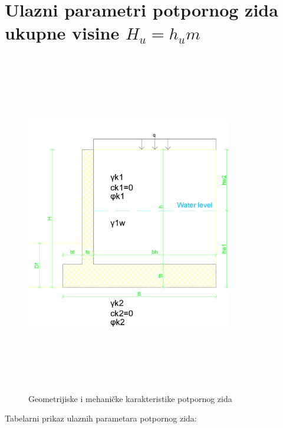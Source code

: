 \documentclass[a4paper, 11pt]{article}
\begin{document}
\begin{titlepage}
\tableofcontents
\end{titlepage}

\section*{Ulazni parametri potpornog zida ukupne visine $H_{u} = h_u m$}

\vspace{3cm}

\begin{figure}[h]
    \centering
    \includegraphics[width=0.8\textwidth, height=15cm]{../Graphics/RetainingWall1_geometry.png}
    \caption{Geometrijiske i mehani\v{c}ke karakteristike potpornog zida}
    \label{geometrija_zida}
\end{figure}

\newpage

\begin{center}
Tabelarni prikaz ulaznih parametara potpornog zida:
\end{center}
\end{document}
